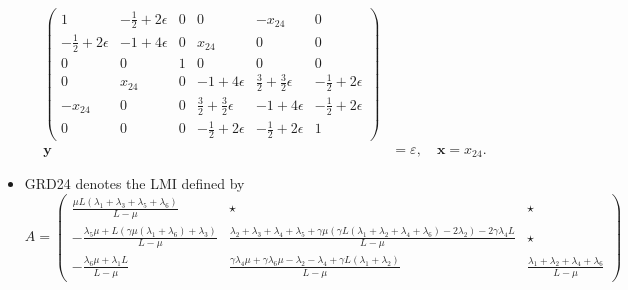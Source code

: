 \documentclass[nonacm]{acmart}
\newcommand{\x}{\bm{x}}
\newcommand{\y}{\bm{y}}
\begin{document}
\begin{itemize}
\begin{align*}
\begin{pmatrix}
                  1                      & -\frac{1}{2}+2\epsilon & 0 & 0                               & -x_{24}                         & 0                      \\
                  -\frac{1}{2}+2\epsilon & -1+4\epsilon           & 0 & x_{24}                          & 0                               & 0                      \\
                  0                      & 0                      & 1 & 0                               & 0                               & 0                      \\
                  0                      & x_{24}                 & 0 & -1+4\epsilon                    & \frac{3}{2}+\frac{3}{2}\epsilon & -\frac{1}{2}+2\epsilon \\
                  -x_{24}                & 0                      & 0 & \frac{3}{2}+\frac{3}{2}\epsilon & -1+4\epsilon                    & -\frac{1}{2}+2\epsilon \\
                  0                      & 0                      & 0 & -\frac{1}{2}+2\epsilon          & -\frac{1}{2}+2\epsilon          & 1
              \end{pmatrix} \\
              \y & =\varepsilon, \quad \x=x_{24}.
          \end{align*}
    \item \textsf{GRD24} denotes the LMI defined by
          \begin{equation*}
              A=
              \begin{pmatrix}
                  \frac{\mu  L (\lambda_1+\lambda_3+\lambda_5+\lambda_6)}{L-\mu }                & \star                                                                                                                                                       & \star                                                  \\
                  -\frac{\lambda_5 \mu +L (\gamma  \mu  (\lambda_1+\lambda_6)+\lambda_3)}{L-\mu} & \frac{\lambda_2+\lambda_3+\lambda_4+\lambda_5+\gamma  \mu  (\gamma  L (\lambda_1+\lambda_2+\lambda_4+\lambda_6)-2 \lambda_2)-2 \gamma  \lambda_4 L}{L-\mu } & \star                                                  \\
                  -\frac{\lambda_6 \mu +\lambda_1 L}{L-\mu }                                     & \frac{\gamma  \lambda_4 \mu +\gamma  \lambda_6 \mu -\lambda_2-\lambda_4+\gamma  L (\lambda_1+\lambda_2)}{L-\mu }                                            & \frac{\lambda_1+\lambda_2+\lambda_4+\lambda_6}{L-\mu }

\end{pmatrix}
\end{equation*}
\end{itemize}
\end{document}
